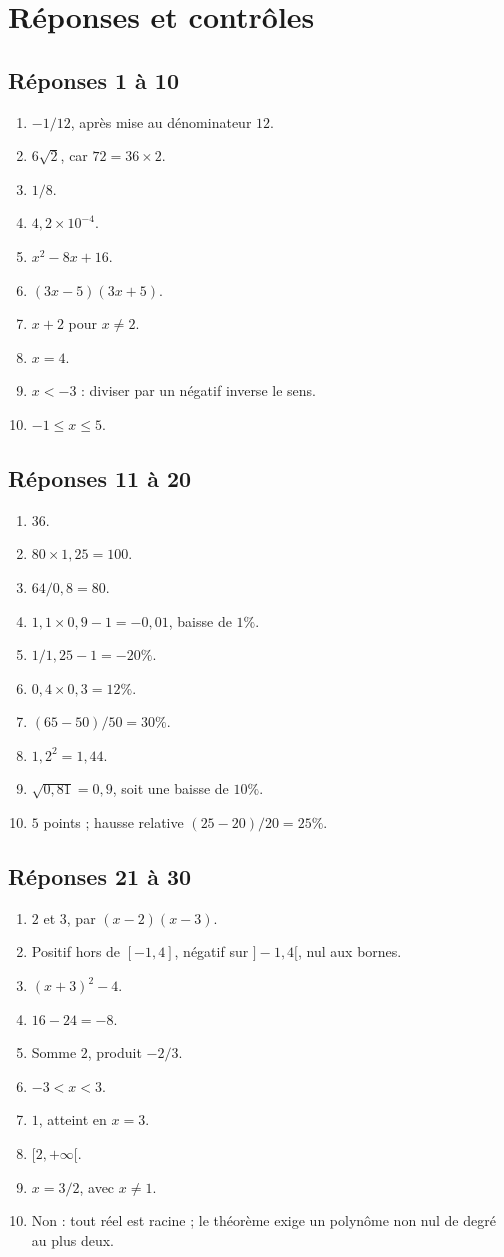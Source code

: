 \documentclass[11pt,a4paper,oneside]{book}
\begin{document}
\chapter{Réponses et contrôles}
\section{Réponses 1 à 10}
\begin{enumerate}[start=1]
\item $-1/12$, après mise au dénominateur $12$.
\item $6\sqrt2$, car $72=36\times2$.
\item $1/8$.
\item $4{,}2\times10^{-4}$.
\item $x^2-8x+16$.
\item $(3x-5)(3x+5)$.
\item $x+2$ pour $x\ne2$.
\item $x=4$.
\item $x<-3$ : diviser par un négatif inverse le sens.
\item $-1\le x\le5$.
\end{enumerate}
\section{Réponses 11 à 20}
\begin{enumerate}[start=11]
\item $36$.
\item $80\times1{,}25=100$.
\item $64/0{,}8=80$.
\item $1{,}1\times0{,}9-1=-0{,}01$, baisse de $1\%$.
\item $1/1{,}25-1=-20\%$.
\item $0{,}4\times0{,}3=12\%$.
\item $(65-50)/50=30\%$.
\item $1{,}2^2=1{,}44$.
\item $\sqrt{0{,}81}=0{,}9$, soit une baisse de $10\%$.
\item $5$ points ; hausse relative $(25-20)/20=25\%$.
\end{enumerate}
\section{Réponses 21 à 30}
\begin{enumerate}[start=21]
\item $2$ et $3$, par $(x-2)(x-3)$.
\item Positif hors de $[-1,4]$, négatif sur $]-1,4[$, nul aux bornes.
\item $(x+3)^2-4$.
\item $16-24=-8$.
\item Somme $2$, produit $-2/3$.
\item $-3<x<3$.
\item $1$, atteint en $x=3$.
\item $[2,+\infty[$.
\item $x=3/2$, avec $x\ne1$.
\item Non : tout réel est racine ; le théorème exige un polynôme non nul de degré au plus deux.
\end{enumerate}
\end{document}
